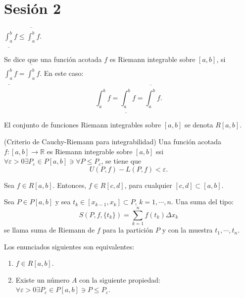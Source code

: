 \section{Sesión 2}

\begin{prop}
	$\underline{\int_a^b}f \leq \overline{\int_a^b}f$.
\end{prop}

\begin{definicion}
	Se dice que una función acotada $f$ es Riemann integrable sobre $[a,b]$, si $\underline{\int_a^b}f = \overline{\int_a^b}f$. En este caso: 
	$$\int_a^b f =\underline{\int_a^b}f =\overline{\int_a^b}f.$$
\end{definicion}
\begin{definicion}
	El conjunto de funciones Riemann integrables sobre $[a,b]$ se denota $R[a,b]$. 
\end{definicion}
\begin{teorema}(Criterio de Cauchy-Riemann para integrabilidad)
	Una función acotada $f:[a,b]\to \mathbb{R}$ es Riemann integrable sobre $[a,b]$ ssi 
	$\forall \varepsilon >0 \exists P_\varepsilon \in P[a,b]\ni \forall P \leqslant P_\varepsilon$, se tiene que $$U(P,f)-L(P,f)<\varepsilon.$$
\end{teorema}

\begin{teorema}
	Sea $f\in R[a,b]$. Entonces, $f\in R[c,d]$, para cualquier $[c,d]\subset [a,b]$. 
\end{teorema}

\begin{definicion}
	Sea $P\in P[a,b]$ y sea $t_k\in [x_{k-1},x_k]\subset P$, $k=1,\cdots, n$. Una suma del tipo: 
	$$S(P,f,\{t_k\})=\sum_{k=1}^{n}f(t_k)\Delta x_k$$
	se llama suma de Riemann de $f$ para la partición $P$ y con la muestra $t_1,\cdots, t_n$. 
\end{definicion}

\begin{teorema}
	Los enunciados siguientes son equivalentes: 
	\begin{enumerate}
		\item $f\in R[a,b]$.
		\item Existe un número $A$ con la siguiente propiedad: 
		$\forall \varepsilon >0 \exists P_\varepsilon \in P[a,b]\ni P\leqslant P_\varepsilon$. 
	\end{enumerate}
\end{teorema}

